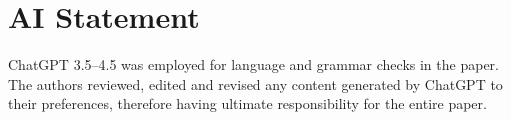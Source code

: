 \section*{AI Statement}
ChatGPT 3.5--4.5 was employed for language and grammar checks in the paper. The authors reviewed, edited and revised any content generated by ChatGPT to their preferences, therefore having ultimate responsibility for the entire paper.
